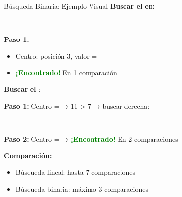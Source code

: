 \documentclass[10pt]{beamer}
\begin{document}
\begin{frame}{Búsqueda Binaria: Ejemplo Visual}
  \small
  \textbf{Buscar el}  \textbf{en:}
  \begin{center}\vspace{-0.15cm}
     \,
     \,
     \,
     \,
     \,
     \,
  \end{center}\vspace{-0.25cm}
  
  \textbf{Paso 1:}
  \begin{itemize}\setlength{\itemsep}{0pt}
    \item Centro: posición 3, valor = 
    \item \textcolor{green}{\textbf{¡Encontrado!}} En 1 comparación
  \end{itemize}
  
  \textbf{Buscar el} :
  
  \textbf{Paso 1:} Centro =  → 11 > 7 → buscar derecha:
  \begin{center}\vspace{-0.15cm}
     \,
     \,
  \end{center}\vspace{-0.2cm}
  
  \textbf{Paso 2:} Centro =  → \textcolor{green}{\textbf{¡Encontrado!}} En 2 comparaciones
  
  \vspace{0.1cm}
  \textbf{Comparación:}
  \begin{itemize}\setlength{\itemsep}{0pt}
    \item Búsqueda lineal: hasta 7 comparaciones
    \item Búsqueda binaria: máximo 3 comparaciones
  \end{itemize}
\end{frame}
\end{document}
